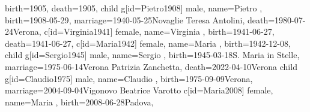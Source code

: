 \documentclass{article}
\begin{document}
\begin{midpage}
\begin{center}
\begin{genealogypicture}
{{{{{{{{{                                    birth={1905}{},
                                    death={1905}{},
                                }
                                child{
                                    g[id=Pietro1908]{
                                        male,
                                        name={Pietro },
                                        birth={1908-05-29}{},
                                        marriage={1940-05-25}{Novaglie \newline Teresa Antolini},
                                        death={1980-07-24}{Verona},
                                    }
                                    c[id=Virginia1941]{
                                        female,
                                        name={Virginia },
                                        birth={1941-06-27}{},
                                        death={1941-06-27}{},
                                    }
                                    c[id=Maria1942]{
                                        female,
                                        name={Maria },
                                        birth={1942-12-08}{},
                                    }
                                    child{
                                        g[id=Sergio1945]{
                                            male,
                                            name={Sergio },
                                            birth={1945-03-18}{S. Maria in Stelle},
                                            marriage={1975-06-14}{Verona \newline Patrizia Zanchetta},
                                            death={2022-04-10}{Verona}
                                        }
                                        child{
                                            g[id=Claudio1975]{
                                                male,
                                                name={Claudio },
                                                birth={1975-09-09}{Verona},
                                                marriage={2004-09-04}{Vigonovo \newline Beatrice Varotto}
                                            }
                                            c[id=Maria2008]{
                                                female,
                                                name={Maria },
                                                birth={2008-06-28}{Padova},
}}}}}}}}}}}}
\end{genealogypicture}
\end{center}
\end{midpage}
\end{document}
